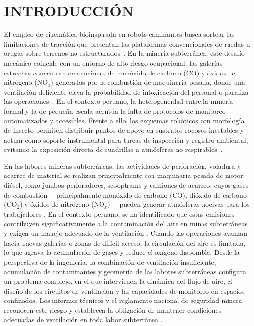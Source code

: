 
\chapter{INTRODUCCIÓN} 


El empleo de cinemática bioinspirada en robots caminantes busca sortear las limitaciones de tracción que presentan las plataformas convencionales de ruedas u orugas sobre terrenos no estructurados~\cite{James2021_InsectLegDesign, DungBeetle_2023_Cybernetics}. En la minería subterránea, este desafío mecánico coincide con un entorno de alto riesgo ocupacional: las galerías estrechas concentran emanaciones de monóxido de carbono ($\text{CO}$) y óxidos de nitrógeno ($\text{NO}_x$) generados por la combustión de maquinaria pesada, donde una ventilación deficiente eleva la probabilidad de intoxicación del personal o paraliza las operaciones~\cite{AdvancesMining_2023, AdaptiveControl_Mines_2025}. En el contexto peruano, la heterogeneidad entre la minería formal y la de pequeña escala acentúa la falta de protocolos de monitoreo automatizados y accesibles. Frente a ello, los esquemas robóticos con morfología de insecto permiten distribuir puntos de apoyo en sustratos rocosos inestables y actuar como soporte instrumental para tareas de inspección y registro ambiental, evitando la exposición directa de cuadrillas a atmósferas no respirables~\cite{KimChoi_2025_MineMapping, Zhou2023_BioinspiredSensors, Liu2025_PiezoBioinspired}.




En las labores mineras subterráneas, las actividades de perforación, voladura y acarreo de material se realizan principalmente con maquinaria pesada de motor diésel, como jumbos perforadores, scooptrams y camiones de acarreo, cuyos gases de combustión —principalmente monóxido de carbono (CO), dióxido de carbono (CO$_2$) y óxidos de nitrógeno (NO$_x$)— pueden generar atmósferas nocivas para los trabajadores \cite{EconomiaCircular_Maquinaria_2023, EmisionesDiesel_2021}. En el contexto peruano, se ha identificado que estas emisiones contribuyen significativamente a la contaminación del aire en minas subterráneas y exigen un manejo adecuado de la ventilación \cite{GEI_MinasPeru_2022}. Cuando las operaciones avanzan hacia nuevas galerías o zonas de difícil acceso, la circulación del aire es limitada, lo que agrava la acumulación de gases y reduce el oxígeno disponible. Desde la perspectiva de la ingeniería, la combinación de ventilación insuficiente, acumulación de contaminantes y geometría de las labores subterráneas configura un problema complejo, en el que intervienen la dinámica del flujo de aire, el diseño de los circuitos de ventilación y las capacidades de monitoreo en espacios confinados. Los informes técnicos y el reglamento nacional de seguridad minera reconocen este riesgo y establecen la obligación de mantener condiciones adecuadas de ventilación en toda labor subterránea \cite{OSINERGMIN_BoletinGSM_2020, MINEM_DS024_2016}.


